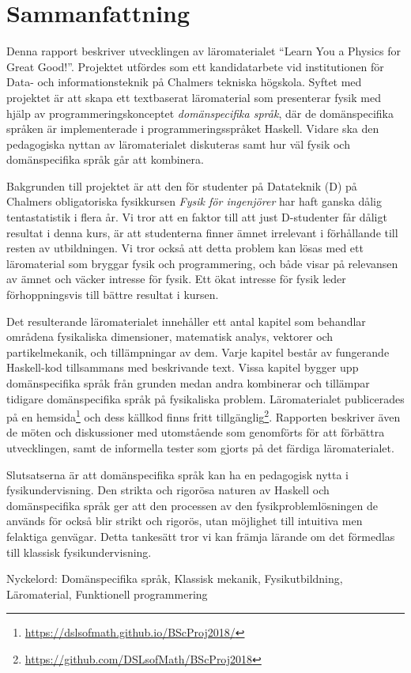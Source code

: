 
\thispagestyle{plain}			%

\section*{Sammanfattning}

Denna rapport beskriver utvecklingen av läromaterialet ``Learn You a
Physics for Great Good!''. Projektet utfördes som ett kandidatarbete vid institutionen
för Data- och informationsteknik på Chalmers tekniska högskola. Syftet
med projektet är att skapa ett textbaserat läromaterial som presenterar fysik med hjälp av programmeringskonceptet
\textit{domänspecifika språk}, där de domänspecifika språken är
implementerade i programmeringsspråket Haskell. Vidare ska 
den pedagogiska nyttan av läromaterialet diskuteras samt hur väl fysik och
domänspecifika språk går att kombinera.

Bakgrunden till projektet är att den för studenter på Datateknik (D) på
Chalmers obligatoriska fysikkursen \textit{Fysik för ingenjörer} har
haft ganska dålig tentastatistik i flera år. Vi tror att en
faktor till att just D-studenter får dåligt resultat i denna
kurs, är att studenterna finner ämnet irrelevant i förhållande till
resten av utbildningen. Vi tror också att detta problem kan lösas med ett
läromaterial som bryggar fysik och
programmering, och både visar på relevansen av ämnet och väcker
intresse för fysik. Ett ökat intresse för fysik leder förhoppningsvis
till bättre resultat i kursen.

Det resulterande läromaterialet innehåller ett antal kapitel som
behandlar områdena fysikaliska dimensioner, matematisk analys,
vektorer och partikelmekanik, och tillämpningar av dem. Varje kapitel
består av fungerande Haskell-kod tillsammans med beskrivande
text. Vissa kapitel bygger upp domänspecifika språk från grunden medan
andra kombinerar och tillämpar tidigare domänspecifika språk på
fysikaliska problem. Läromaterialet publicerades på en hemsida\footnote{\url{https://dslsofmath.github.io/BScProj2018/}}
och dess källkod finns
fritt tillgänglig\footnote{\url{https://github.com/DSLsofMath/BScProj2018}}. Rapporten beskriver
även de möten och diskussioner med utomstående som genomförts för att
förbättra utvecklingen, samt de informella tester som gjorts på det
färdiga läromaterialet.

Slutsatserna är att
domänspecifika språk kan ha en pedagogisk nytta i
fysikundervisning. Den strikta och
rigorösa naturen av Haskell och domänspecifika språk ger att den
processen av den fysikproblemlösningen de används för också blir
strikt och rigorös, utan möjlighet till intuitiva men felaktiga
genvägar. Detta tankesätt tror vi kan främja lärande om det förmedlas
till klassisk fysikundervisning.

\vfill
Nyckelord: Domänspecifika språk, Klassisk mekanik, Fysikutbildning, Läromaterial, Funktionell programmering

\newpage				%
\thispagestyle{empty}
\mbox{}
